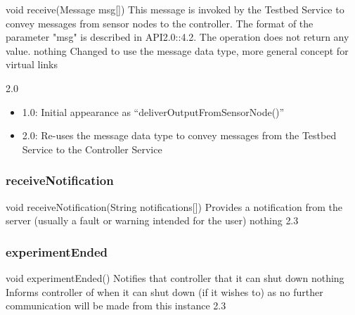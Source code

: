 \begin{apidoc}
	{void receive(Message msg[])} %
	{This message is invoked by the Testbed Service to convey messages from sensor nodes to the controller. The format of the parameter "msg" is described in API2.0::4.2. The operation does not return any value.
	} %
	{
	} %
	{nothing} %
	{Changed to use the message data type, more general concept for virtual links} %
	{2.0
		\begin{itemize}
			\item 1.0: Initial appearance as ``deliverOutputFromSensorNode()''
			\item 2.0: Re-uses the message data type to convey messages from the Testbed Service to the Controller Service 
		\end{itemize}
	} %
\end{apidoc}

		\subsubsection{receiveNotification}

\begin{apidoc}
	{void receiveNotification(String notifications[])} %
	{Provides a notification from the server (usually a fault or warning intended for the user)} %
	{
	} %
	{nothing} %
	{} %
	{2.3} %
\end{apidoc}

		\subsubsection{experimentEnded}

\begin{apidoc}
	{void experimentEnded()} %
	{Notifies that controller that it can shut down} %
	{
	} %
	{nothing} %
	{Informs controller of when it can shut down (if it wishes to) as no further communication will be made from this instance} %
	{2.3} %
\end{apidoc}